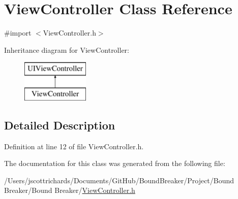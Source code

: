\hypertarget{interface_view_controller}{}\section{View\+Controller Class Reference}
\label{interface_view_controller}


{\ttfamily \#import $<$View\+Controller.\+h$>$}

Inheritance diagram for View\+Controller\+:\begin{figure}[H]
\begin{center}
\leavevmode
\includegraphics[height=2.000000cm]{interface_view_controller}
\end{center}
\end{figure}


\subsection{Detailed Description}


Definition at line 12 of file View\+Controller.\+h.



The documentation for this class was generated from the following file\+:\begin{DoxyCompactItemize}
\item 
/\+Users/jscottrichards/\+Documents/\+Git\+Hub/\+Bound\+Breaker/\+Project/\+Bound Breaker/\+Bound Breaker/\hyperlink{_view_controller_8h}{View\+Controller.\+h}\end{DoxyCompactItemize}
